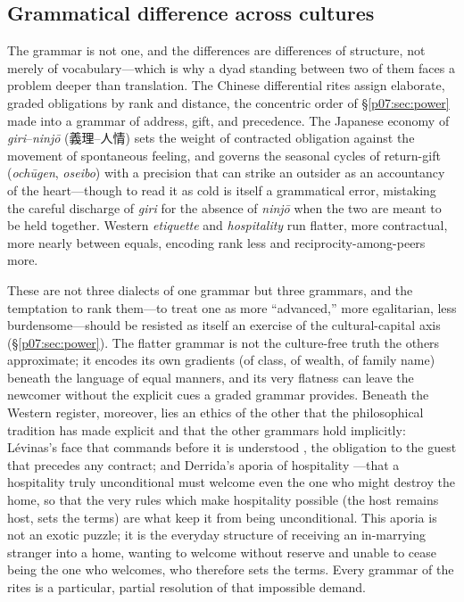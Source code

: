 \documentclass[11pt,a4paper]{article}
\newcommand{\zh}[1]{{\cjk #1}}
\newcommand{\xref}[1]{\textcolor{rose}{\S\ref{#1}}}
\begin{document}
\subsection{Grammatical difference across cultures}
The grammar is not one, and the differences are differences of structure, not merely of vocabulary---which is why a dyad standing between two of them faces a problem deeper than translation. The Chinese differential rites assign elaborate, graded obligations by rank and distance, the concentric order of \xref{p07:sec:power} made into a grammar of address, gift, and precedence. The Japanese economy of \emph{giri}--\emph{ninjō} (\zh{義理}--\zh{人情}) sets the weight of contracted obligation against the movement of spontaneous feeling, and governs the seasonal cycles of return-gift (\emph{ochūgen}, \emph{oseibo}) with a precision that can strike an outsider as an accountancy of the heart---though to read it as cold is itself a grammatical error, mistaking the careful discharge of \emph{giri} for the absence of \emph{ninjō} when the two are meant to be held together. Western \emph{etiquette} and \emph{hospitality} run flatter, more contractual, more nearly between equals, encoding rank less and reciprocity-among-peers more.

These are not three dialects of one grammar but three grammars, and the temptation to rank them---to treat one as more ``advanced,'' more egalitarian, less burdensome---should be resisted as itself an exercise of the cultural-capital axis (\xref{p07:sec:power}). The flatter grammar is not the culture-free truth the others approximate; it encodes its own gradients (of class, of wealth, of family name) beneath the language of equal manners, and its very flatness can leave the newcomer without the explicit cues a graded grammar provides. Beneath the Western register, moreover, lies an ethics of the other that the philosophical tradition has made explicit and that the other grammars hold implicitly: Lévinas's face that commands before it is understood \parencite{levinas1961}, the obligation to the guest that precedes any contract; and Derrida's aporia of hospitality \parencite{derrida2000hospitality}---that a hospitality truly unconditional must welcome even the one who might destroy the home, so that the very rules which make hospitality possible (the host remains host, sets the terms) are what keep it from being unconditional. This aporia is not an exotic puzzle; it is the everyday structure of receiving an in-marrying stranger into a home, wanting to welcome without reserve and unable to cease being the one who welcomes, who therefore sets the terms. Every grammar of the rites is a particular, partial resolution of that impossible demand.
\end{document}
